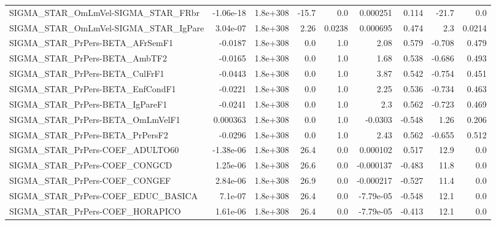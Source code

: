 \begin{tabular}{lrrrrrrrr}
SIGMA\_STAR\_OmLmVel-SIGMA\_STAR\_FRbr    &   -1.06e-18 &     1.8e+308 &   -15.7 &      0.0 &   0.000251 &       0.114 &        -21.7 &           0.0 \\
SIGMA\_STAR\_OmLmVel-SIGMA\_STAR\_IgPare  &    3.04e-07 &     1.8e+308 &    2.26 &   0.0238 &   0.000695 &       0.474 &          2.3 &        0.0214 \\
SIGMA\_STAR\_PrPers-BETA\_AFrSemF1       &     -0.0187 &     1.8e+308 &     0.0 &      1.0 &       2.08 &       0.579 &       -0.708 &         0.479 \\
SIGMA\_STAR\_PrPers-BETA\_AmbTF2         &     -0.0165 &     1.8e+308 &     0.0 &      1.0 &       1.68 &       0.538 &       -0.686 &         0.493 \\
SIGMA\_STAR\_PrPers-BETA\_CulFrF1        &     -0.0443 &     1.8e+308 &     0.0 &      1.0 &       3.87 &       0.542 &       -0.754 &         0.451 \\
SIGMA\_STAR\_PrPers-BETA\_EnfCondF1      &     -0.0221 &     1.8e+308 &     0.0 &      1.0 &       2.25 &       0.536 &       -0.734 &         0.463 \\
SIGMA\_STAR\_PrPers-BETA\_IgPareF1       &     -0.0241 &     1.8e+308 &     0.0 &      1.0 &        2.3 &       0.562 &       -0.723 &         0.469 \\
SIGMA\_STAR\_PrPers-BETA\_OmLmVelF1      &    0.000363 &     1.8e+308 &     0.0 &      1.0 &    -0.0303 &      -0.548 &         1.26 &         0.206 \\
SIGMA\_STAR\_PrPers-BETA\_PrPersF2       &     -0.0296 &     1.8e+308 &     0.0 &      1.0 &       2.43 &       0.562 &       -0.655 &         0.512 \\
SIGMA\_STAR\_PrPers-COEF\_ADULTO60       &   -1.38e-06 &     1.8e+308 &    26.4 &      0.0 &   0.000102 &       0.517 &         12.9 &           0.0 \\
SIGMA\_STAR\_PrPers-COEF\_CONGCD         &    1.25e-06 &     1.8e+308 &    26.6 &      0.0 &  -0.000137 &      -0.483 &         11.8 &           0.0 \\
SIGMA\_STAR\_PrPers-COEF\_CONGEF         &    2.84e-06 &     1.8e+308 &    26.9 &      0.0 &  -0.000217 &      -0.527 &         11.4 &           0.0 \\
SIGMA\_STAR\_PrPers-COEF\_EDUC\_BASICA    &     7.1e-07 &     1.8e+308 &    26.4 &      0.0 &  -7.79e-05 &      -0.548 &         12.1 &           0.0 \\
SIGMA\_STAR\_PrPers-COEF\_HORAPICO       &    1.61e-06 &     1.8e+308 &    26.4 &      0.0 &  -7.79e-05 &      -0.413 &         12.1 &           0.0 \\

\end{tabular}
